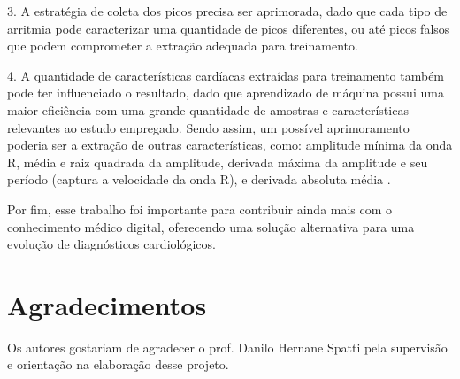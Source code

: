 \documentclass[conference]{IEEEtran}
\begin{document}
3. A estratégia de coleta dos picos precisa ser aprimorada, dado que cada tipo de arritmia pode caracterizar uma quantidade de picos diferentes, ou até picos falsos que podem comprometer a extração adequada para treinamento.

4. A quantidade de características cardíacas extraídas para treinamento também pode ter influenciado o resultado, dado que aprendizado de máquina possui uma maior eficiência com uma grande quantidade de amostras e características relevantes ao estudo empregado. Sendo assim, um possível aprimoramento poderia ser a extração de outras características, como: amplitude mínima da onda R, média e raiz quadrada da amplitude, derivada máxima da amplitude e seu período (captura a velocidade da onda R), e derivada absoluta média \cite{barrella14}.

Por fim, esse trabalho foi importante para contribuir ainda mais com o conhecimento médico digital, oferecendo uma solução alternativa para uma evolução de diagnósticos cardiológicos.



\section*{Agradecimentos}

Os autores gostariam de agradecer o prof. Danilo Hernane Spatti pela supervisão e orientação na elaboração desse projeto.



\def\refname{Referências}


%






\end{document}
